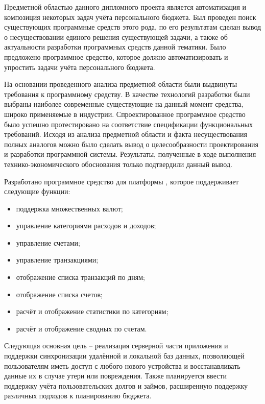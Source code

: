 
Предметной областью данного дипломного проекта является автоматизация и композиция некоторых задач учёта персонального бюджета.
Был проведен поиск существующих программные средств этого рода, по его результатам сделан вывод о несуществовании единого решения существующей задачи, а также об актуальности разработки программных средств данной тематики.
Было предложено программное средство, которое должно автоматизировать и упростить задачи учёта персонального бюджета.

На основании проведенного анализа предметной области были выдвинуты требования к программному средству.
В качестве технологий разработки были выбраны наиболее современные существующие на данный момент средства, широко применяемые в индустрии.
Спроектированное программное средство было успешно протестировано на соответствие спецификации функциональных требований.
Исходя из анализа предметной области и факта несуществования полных аналогов можно было сделать вывод о целесообразности проектирования и разработки программной системы.
Результаты, полученные в ходе выполнения технико-экономического обоснования только подтвердили данный вывод.

Разработано программное средство для платформы \andro, которое поддерживает следующие функции:
\begin{itemize}
    \item поддержка множественных валют;
    \item управление категориями расходов и доходов;
    \item управление счетами;
    \item управление транзакциями;
    \item отображение списка транзакций по дням;
    \item отображение списка счетов;
    \item расчёт и отображение статистики по категориям;
    \item расчёт и отображение сводных по счетам.
\end{itemize}

Следующая основная цель -- реализация серверной части приложения и поддержки синхронизации удалённой и локальной баз данных, позволяющей пользователям иметь доступ с любого нового устройства и восстанавливать данные их в случае утери или повреждения.
Также планируется ввести поддержку учёта пользовательских долгов и займов, расширенную поддержку различных подходов к планированию бюджета.